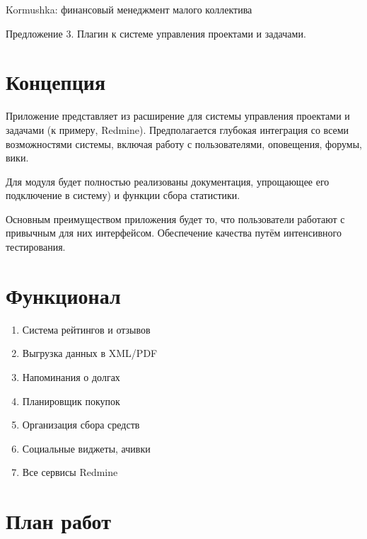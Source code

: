 \documentclass[a4paper,12pt]{article} %
\begin{document}
\thispagestyle{empty}%

\begin{flushright}

Kormushka: финансовый менеджмент малого коллектива

Предложение 3. Плагин к системе  управления проектами и задачами.

\hrulefill
\end{flushright}

\section*{Концепция}

Приложение представляет из расширение для системы управления проектами и задачами (к примеру, Redmine). Предполагается глубокая интеграция со всеми возможностями системы, включая работу с пользователями, оповещения, форумы, вики.

Для модуля будет полностью реализованы документация, упрощающее его подключение в систему) и функции сбора статистики.

Основным преимуществом приложения будет то, что пользователи работают с привычным для них интерфейсом. Обеспечение качества путём интенсивного тестирования.

\section*{Функционал}

\begin{enumerate}

\item Система рейтингов и отзывов
\item Выгрузка данных в XML/PDF
\item Напоминания о долгах
\item Планировщик покупок
\item Организация сбора средств
\item Социальные виджеты, ачивки
\item Все сервисы Redmine

\end{enumerate}

\section*{План работ}
\end{document}
